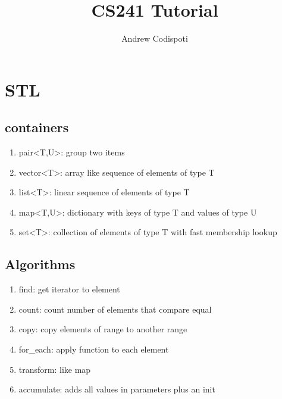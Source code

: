 \documentclass[11pt]{amsart}
\title{CS241 Tutorial}
\author{Andrew Codispoti}
\begin{document}
\maketitle
\section{STL}
\subsection{containers}
\begin{enumerate}
    \item pair<T,U>: group two items
    \item vector<T>: array like sequence of elements of type T
    \item list<T>: linear sequence of elements of type T
    \item map<T,U>: dictionary with keys of type T and values of type U
    \item set<T>: collection of elements of type T with fast membership lookup
\end{enumerate}
\subsection{Algorithms}
\begin{enumerate}
    \item find: get iterator to element
    \item count: count number of elements that compare equal
    \item copy: copy elements of range to another range
    \item for\_each: apply function to each element
    \item transform: like map 
    \item accumulate: adds all values in parameters plus an init
\end{enumerate}
\end{document}
